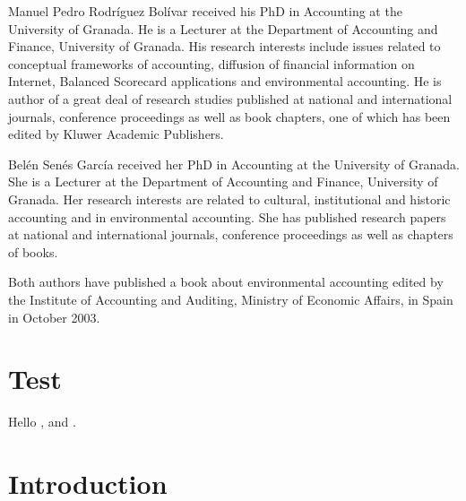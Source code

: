 \documentclass{singlecol-new}
\theoremstyle{TH}{
\newtheorem{lemma}{Lemma}
\newtheorem{theorem}[lemma]{Theorem}
\newtheorem{corrolary}[lemma]{Corrolary}
\newtheorem{conjecture}[lemma]{Conjecture}
\newtheorem{proposition}[lemma]{Proposition}
\newtheorem{claim}[lemma]{Claim}
\newtheorem{stheorem}[lemma]{Wrong Theorem}
\newtheorem{algorithm}{Algorithm}
}
\theoremstyle{THrm}{
\newtheorem{definition}{Definition}[section]
\newtheorem{question}{Question}[section]
\newtheorem{remark}{Remark}
\newtheorem{scheme}{Scheme}
}
\theoremstyle{THhit}{
\newtheorem{case}{Case}[section]
}
\begin{document}


\begin{bio}
Manuel Pedro Rodr\'iguez Bol\'ivar received his PhD in Accounting at
the University of Granada. He is a Lecturer at the Department of
Accounting and Finance, University of Granada. His research
interests include issues related to conceptual frameworks of
accounting, diffusion of financial information on Internet, Balanced
Scorecard applications and environmental accounting. He is author of
a great deal of research studies published at national and
international journals, conference proceedings as well as book
chapters, one of which has been edited by Kluwer Academic
Publishers.

\noindent Bel\'en Sen\'es Garc\'ia received her PhD in Accounting at
the University of Granada. She is a Lecturer at the Department of
Accounting and Finance, University of Granada. Her research
interests are related to cultural, institutional and historic
accounting and in environmental accounting. She has published
research papers at national and international journals, conference
proceedings as well as chapters of books.

\noindent Both authors have published a book about environmental
accounting edited by the Institute of Accounting and Auditing,
Ministry of Economic Affairs, in Spain in October 2003.
\end{bio}


\maketitle



\section{Test}

Hello \cite{ONeil_2020}, \cite{hashim2021higher} and \cite{spearman1904general}.


\section{Introduction}
\end{document}
